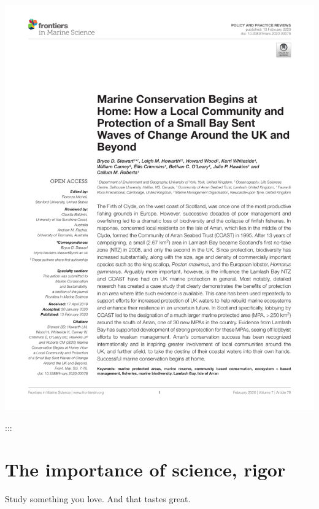 \documentclass[
]{book}
\begin{document}
\begin{center}\includegraphics[width=1\linewidth]{_images/marine} \end{center}

:::

\hypertarget{the-importance-of-science-rigor}{%
\chapter{The importance of science, rigor}\label{the-importance-of-science-rigor}}

Study something you love. And that tastes great.
\end{document}
